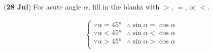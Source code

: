 \documentclass[12pt,answers]{exam}
\newcommand{\qndate}[2]{(\textbf{#1 #2})}
\begin{document}
\begin{questions}
  \question \qndate{28}{Jul} For acute angle $\alpha$, fill in the blanks
  with $>$, $=$, or $<$.
  \begin{solution}
    \begin{align*}
      \begin{cases}
        \because \alpha = \ang{45} &\therefore \sin \alpha = \cos \alpha \\
        \because \alpha < \ang{45} &\therefore \sin \alpha < \cos \alpha \\
        \because \alpha > \ang{45} &\therefore \sin \alpha > \cos \alpha \\
      \end{cases}
    \end{align*}
  \end{solution}

\end{questions}
\end{document}
